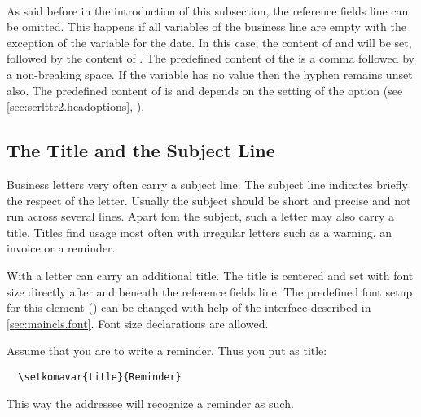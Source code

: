 \begin{Declaration}
  \\
\end{Declaration}
%
%
As said before in the introduction of this subsection, the reference
fields line can be omitted. This happens if all variables of the
business line are empty with the exception of the variable for the
date. In this case, the content of  and
 will be set, followed by the content of
. The predefined content of the
 is a comma followed by a non-breaking
space. If the variable  has no value then the hyphen
remains unset also.  The predefined content of  is
 and depends on the setting of the option
 (see \autoref{sec:scrlttr2.headoptions},
).
%
%
%
%
%


\subsection{The Title and the Subject Line}
\label{sec:scrlttr2.titleSubject}
Business letters very often carry a subject line. The subject line
indicates briefly the respect of the letter. Usually the subject
should be short and precise and not run across several lines. Apart
fom the subject, such a letter may also carry a title.  Titles find
usage most often with irregular letters such as a warning, an invoice
or a reminder.


\begin{Declaration}
\end{Declaration}
%
With  a letter can carry an additional title. The
title is centered and set with font size  directly after
and beneath the reference fields line.  The predefined font setup for
this element () can
be changed with help of the interface described in
\autoref{sec:maincls.font}. Font size declarations are allowed.
\begin{Example}
  Assume that you are to write a reminder. Thus you put as title:
\begin{lstlisting}
  \setkomavar{title}{Reminder}
\end{lstlisting}
  This way the addressee will recognize a reminder as such.
\end{Example}
%


